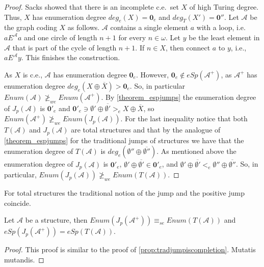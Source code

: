 \documentclass[11pt]{amsart}
\newcommand{\A}{{\mathcal{A}}}
\newcommand{\mbf}[1]{\mathbf{#1}}
\begin{document}
\begin{proof}
    Sacks showed that there is an incomplete c.e.\ set $X$ of high Turing degree. Thus, $X$ has enumeration degree $deg_e(X)=\mathbf 0_e$ and $deg_T(X')=\mathbf 0''$. Let $\A$ be the graph coding $X$ as follows. $\A$ contains a single element $a$ with a loop, i.e. $aE^{\A}a$ and one circle of length $n+1$ for every $n\in\omega$. Let $y$ be the least element in $\A$ that is part of the cycle of length $n+1$. If $n\in X$, then connect $a$ to $y$, i.e., $aE^\A y$. This finishes the construction. 
    
    As $X$ is c.e., $\A$ has enumeration degree $\mathbf 0_e$. However, $\mbf 0_e\not\in eSp(\A^+)$, as $\A^+$ has enumeration degree $deg_e(X\oplus\overline X)> \mathbf 0_e$. So, in particular $Enum(\A)\not\geq_{we} Enum(\A^+)$.
    By \cref{theorem_espjumps} the enumeration degree of $J_p(\A)$ is $\mathbf 0'_e$ and $\mathbf 0'_e\ni \emptyset'\oplus \overline{\emptyset'}>_e X\oplus\overline X$, so $Enum(\A^+)\not\geq_{we}Enum(J_p(\A)) $. 
    For the last inequality notice that both $T(\A)$ and $J_p(\A)$ are total structures and that by the analogue of \cref{theorem_espjumps} for the traditional jumps of structures we have that the enumeration degree of $T(\A)$ is  $deg_e(\emptyset''\oplus \overline{\emptyset''})$. As mentioned above the enumeration degree of $J_p(\A)$ is $\mathbf 0'_e$, $\emptyset'\oplus \overline{\emptyset'}\in \mathbf 0'_e$, and $\emptyset'\oplus \overline{\emptyset'}<_e \emptyset''\oplus \overline{\emptyset''}$. So, in particular, $Enum(J_p(\A))\not \geq_{we} Enum(T(\A))$.
\end{proof}
For total structures the traditional notion of the jump and the positive jump coincide.
\begin{proposition}
    Let $\A$ be a structure, then $Enum(J_p(\A^+))\equiv_{se}Enum(T(\A))$ and $eSp(J_p(\A^+))=eSp(T(\A))$.
\end{proposition}
\begin{proof}
    This proof is similar to the proof of \cref{prop:tradjumpiscompletion}. Mutatis mutandis.
\end{proof}
\end{document}
